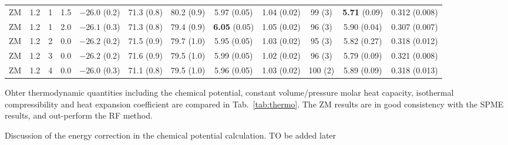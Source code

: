 \documentclass[aip,jcp,a4paper,preprint,unsortedaddress,onecolumn,fleqn]{revtex4-1}
\newcommand{\recheck}[1]{{\color{red} #1}}
\begin{document}
\begin{sidewaystable}
\begin{tabular*}{0.99\textwidth}{@{\extracolsep{\fill}}cccc cccccccc}
    ZM          &1.2 & 1  &1.5 & $-26.0$ (0.2) & 71.3 (0.8)  &80.2 (0.9)           & 5.97 (0.05)               &1.04 (0.02)          & 99 (3)          & \textbf{5.71} (0.09)&        {0.312} (0.008)\\ 
    ZM          &1.2 & 1  &2.0 & $-26.1$ (0.3) & 71.3 (0.8)  &79.4 (0.9)           & \textbf{6.05} (0.05)      &1.05 (0.02)          & 96 (3)          &        {5.90} (0.04)&        {0.307} (0.007)\\\hline
    ZM          &1.2 & 2  &0.0 & $-26.2$ (0.2) & 71.5 (0.9)  &79.7 (1.0)           & 5.95 (0.05)               &1.03 (0.02)          & 95 (3)          &         5.82  (0.27)&         0.318  (0.012)\\
    ZM          &1.2 & 3  &0.0 & $-26.2$ (0.2) & 71.6 (0.9)  &79.5 (1.0)           & 5.99 (0.05)               &1.02 (0.02)          & 96 (3)          &         5.79  (0.09)&         0.321  (0.008)\\
    ZM          &1.2 & 4  &0.0 & $-26.0$ (0.3) & 71.1 (0.8)  &79.5 (1.0)           & 5.96 (0.05)               &1.03 (0.02)          &100 (2)          &         5.89  (0.09)&         0.318  (0.013)\\
    \hline\hline
  \end{tabular*}
  \label{tab:thermo}
\end{sidewaystable}

Ohter thermodynamic quantities including the chemical potential,
constant volume/pressure molar heat capacity, isothermal
compressibility and heat expansion coefficient are compared in
Tab.~\ref{tab:thermo}.
The ZM results are in good consistency with the SPME results, and out-perform
the RF method.

\recheck{Discussion of the energy correction in the chemical potential calculation. TO be added later}
\end{document}
